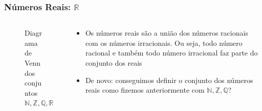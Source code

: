 \documentclass[usenames,dvipsnames,svgnames]{beamer}
\begin{document}
\begin{frame}	
	\frametitle{Números Reais: $\mathbb{R}$}

	\begin{columns}[t]
	\begin{column}{.6\textwidth}
		\begin{figure}
			\def\Ncircle{		(0,0) circle (0.25cm)}
			\def\Zcircle{		(0,0) circle (1.00cm)}
			\def\Qcircle{		(0,0) circle (1.75cm)}
			\def\Rcircle{		(0,0) circle (2.50cm)}

			\caption{\small Diagrama de Venn dos conjuntos $\mathbb{N}, \mathbb{Z}, \mathbb{Q}, \mathbb{R}$}
		\end{figure}
	\end{column}
	\begin{column}{.6\textwidth}
		\begin{itemize}
		\small
		\item Os números reais são a união dos números racionais com os números irracionais. Ou seja, todo número racional e também todo número irracional faz parte do conjunto dos reais
		\item De novo: conseguimos definir o conjunto dos números reais como fizemos anteriormente com $\mathbb{N}, \mathbb{Z}, \mathbb{Q}$?
		\end{itemize}
	\end{column}
	\end{columns}

\end{frame}
\end{document}
